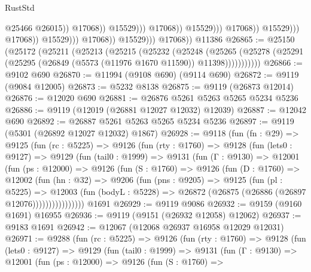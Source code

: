 \begin{lexlean}{RustStd}
\begin{coremodule}
                                                              @25466
                                                              @26015))
                                                          @17068))
                                                      @15529)))
                                                @17068))
                                            @15529)))
                                      @17068))
                                  @15529)))
                            @17068))
                        @15529)))
                  @17068))
              @15529)))
        @17068))
    @11386
@26865 := @25150
    (@25172
      (@25211
        (@25213
          (@25215
            (@25232
              (@25248
                (@25265
                  (@25278 (@25291 (@25295 (@26849 (@5573 (@11976 @1670 @11590)) @11398)))))))))))
@26866 := @9102 @690
@26870 := @11994 (@9108 @690) (@9114 @690)
@26872 := @9119 (@9084 @12005)
@26873 := @5232 @8138
@26875 := @9119 (@26873 @12014)
@26876 := @12020 @690
@26881 := @26876 @5261 @5263 @5265 @5234 @5236
@26886 := @9119 (@12019 (@26881 @12027 @12032) @12039)
@26887 := @12042 @690
@26892 := @26887 @5261 @5263 @5265 @5234 @5236
@26897 := @9119 (@5301 (@26892 @12027 @12032) @1867)
@26928 := @9118
    (fun (fn : @29) =>
    @9125
      (fun (rc : @5225) =>
      @9126
        (fun (rty : @1760) =>
        @9128
          (fun (lets0 : @9127) =>
          @9129
            (fun (tail0 : @1999) =>
            @9131
              (fun (Γ : @9130) =>
              @12001
                (fun (ps : @12000) =>
                @9126
                  (fun (S : @1760) =>
                  @9126
                    (fun (D : @1760) =>
                    @12002
                      (fun (hn : @32) =>
                      @9206
                        (fun (pns : @9205) =>
                        @9125
                          (fun (pl : @5225) =>
                          @12003
                            (fun (bodyL : @5228) =>
                            @26872 (@26875 (@26886 (@26897 @12076))))))))))))))))
    @1691
@26929 := @9119 @9086
@26932 := @9159 (@9160 @1691) @16955
@26936 := @9119 (@9151 (@26932 @12058) @12062)
@26937 := @9183 @1691
@26942 := @12067 (@12068 @26937 @16958 @12029 @12031)
@26971 := @9288
    (fun (rc : @5225) =>
    @9126
      (fun (rty : @1760) =>
      @9128
        (fun (lets0 : @9127) =>
        @9129
          (fun (tail0 : @1999) =>
          @9131
            (fun (Γ : @9130) =>
            @12001
              (fun (ps : @12000) =>
              @9126
                (fun (S : @1760) =>

\end{coremodule}
\end{lexlean}
